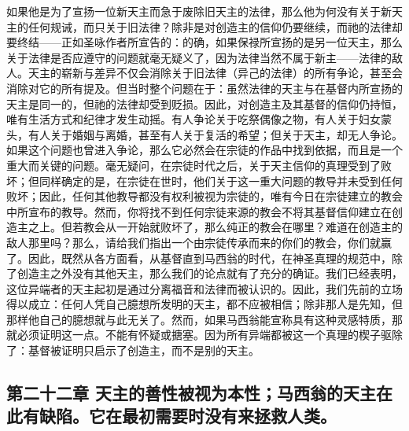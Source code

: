 如果他是为了宣扬一位新天主而急于废除旧天主的法律，那么他为何没有关于新天主的任何规诫，而只关于旧法律？除非是对创造主的信仰仍要继续，而祂的法律却要终结——正如圣咏作者所宣告的：的确，如果保禄所宣扬的是另一位天主，那么关于法律是否应遵守的问题就毫无疑义了，因为法律当然不属于新主——法律的敌人。天主的崭新与差异不仅会消除关于旧法律（异己的法律）的所有争论，甚至会消除对它的所有提及。但当时整个问题在于：虽然法律的天主与在基督内所宣扬的天主是同一的，但祂的法律却受到贬损。因此，对创造主及其基督的信仰仍持恒，唯有生活方式和纪律才发生动摇。有人争论关于吃祭偶像之物，有人关于妇女蒙头，有人关于婚姻与离婚，甚至有人关于复活的希望；但关于天主，却无人争论。如果这个问题也曾进入争论，那么它必然会在宗徒的作品中找到依据，而且是一个重大而关键的问题。毫无疑问，在宗徒时代之后，关于天主信仰的真理受到了败坏；但同样确定的是，在宗徒在世时，他们关于这一重大问题的教导并未受到任何败坏；因此，任何其他教导都没有权利被视为宗徒的，唯有今日在宗徒建立的教会中所宣布的教导。然而，你将找不到任何宗徒来源的教会不将其基督信仰建立在创造主之上。但若教会从一开始就败坏了，那么纯正的教会在哪里？难道在创造主的敌人那里吗？那么，请给我们指出一个由宗徒传承而来的你们的教会，你们就赢了。因此，既然从各方面看，从基督直到马西翁的时代，在神圣真理的规范中，除了创造主之外没有其他天主，那么我们的论点就有了充分的确证。我们已经表明，这位异端者的天主起初是通过分离福音和法律而被认识的。因此，我们先前的立场得以成立：任何人凭自己臆想所发明的天主，都不应被相信；除非那人是先知，但那样他自己的臆想就与此无关了。然而，如果马西翁能宣称具有这种灵感特质，那就必须证明这一点。不能有怀疑或搪塞。因为所有异端都被这一个真理的楔子驱除了：基督被证明只启示了创造主，而不是别的天主。\par


\subsection{第二十二章 天主的善性被视为本性；马西翁的天主在此有缺陷。它在最初需要时没有来拯救人类。}

